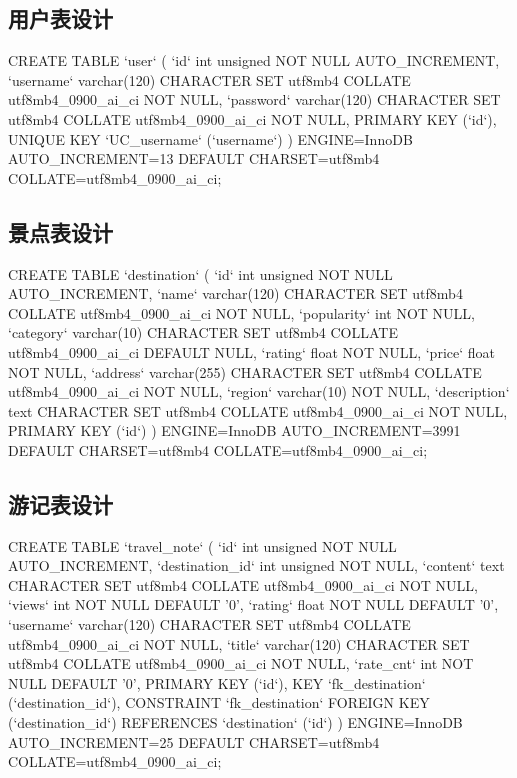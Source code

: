 \documentclass{ctexart}
\begin{document}
\subsection{用户表设计}
\begin{sqlcode}
    CREATE TABLE `user` (
    `id` int unsigned NOT NULL AUTO_INCREMENT,
    `username` varchar(120) CHARACTER SET utf8mb4 COLLATE utf8mb4_0900_ai_ci NOT NULL,
    `password` varchar(120) CHARACTER SET utf8mb4 COLLATE utf8mb4_0900_ai_ci NOT NULL,
    PRIMARY KEY (`id`),
    UNIQUE KEY `UC_username` (`username`)
    ) ENGINE=InnoDB AUTO_INCREMENT=13 DEFAULT CHARSET=utf8mb4 COLLATE=utf8mb4_0900_ai_ci;
\end{sqlcode}

\subsection{景点表设计}
\begin{sqlcode}
    CREATE TABLE `destination` (
    `id` int unsigned NOT NULL AUTO_INCREMENT,
    `name` varchar(120) CHARACTER SET utf8mb4 COLLATE utf8mb4_0900_ai_ci NOT NULL,
    `popularity` int NOT NULL,
    `category` varchar(10) CHARACTER SET utf8mb4 COLLATE utf8mb4_0900_ai_ci DEFAULT NULL,
    `rating` float NOT NULL,
    `price` float NOT NULL,
    `address` varchar(255) CHARACTER SET utf8mb4 COLLATE utf8mb4_0900_ai_ci NOT NULL,
    `region` varchar(10) NOT NULL,
    `description` text CHARACTER SET utf8mb4 COLLATE utf8mb4_0900_ai_ci NOT NULL,
    PRIMARY KEY (`id`)
    ) ENGINE=InnoDB AUTO_INCREMENT=3991 DEFAULT CHARSET=utf8mb4 COLLATE=utf8mb4_0900_ai_ci;
\end{sqlcode}

\subsection{游记表设计}
\begin{sqlcode}
    CREATE TABLE `travel_note` (
    `id` int unsigned NOT NULL AUTO_INCREMENT,
    `destination_id` int unsigned NOT NULL,
    `content` text CHARACTER SET utf8mb4 COLLATE utf8mb4_0900_ai_ci NOT NULL,
    `views` int NOT NULL DEFAULT '0',
    `rating` float NOT NULL DEFAULT '0',
    `username` varchar(120) CHARACTER SET utf8mb4 COLLATE utf8mb4_0900_ai_ci NOT NULL,
    `title` varchar(120) CHARACTER SET utf8mb4 COLLATE utf8mb4_0900_ai_ci NOT NULL,
    `rate_cnt` int NOT NULL DEFAULT '0',
    PRIMARY KEY (`id`),
    KEY `fk_destination` (`destination_id`),
    CONSTRAINT `fk_destination` FOREIGN KEY (`destination_id`) REFERENCES `destination` (`id`)
    ) ENGINE=InnoDB AUTO_INCREMENT=25 DEFAULT CHARSET=utf8mb4 COLLATE=utf8mb4_0900_ai_ci;
\end{sqlcode}
\end{document}
